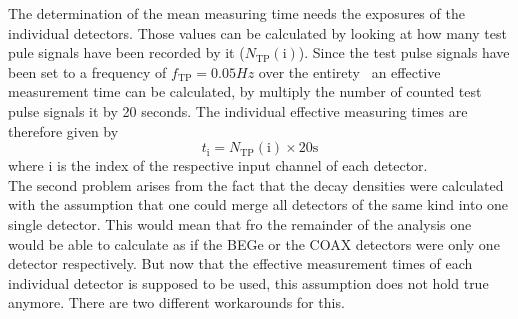\documentclass[encoding=utf8,british]{tumphthesis}
\begin{document}

\iffalse
The determination of the mean measuring time needs the exposures of the individual detectors.
Those values can be calculated by looking at how many test pule signals have been recorded by it ($N_{\mathrm{TP}}(\mathrm{i})$). 
Since the test pulse signals have been set to a frequency of $f_\mathrm{TP} = 0.05\unit{Hz} $ over the entirety \PII\, an effective measurement time can be calculated, by multiply the number of counted test pulse signals it by 20 seconds.
The individual effective measuring times are therefore given by
\begin{equation*}
    t_\mathrm{i} = N_{\mathrm{TP}}(\mathrm{i}) \times 20\mathrm{s}
\end{equation*}
where i is the index of the respective input channel of each detector.
\\

The second problem arises from the fact that the decay densities were  calculated with the assumption that one could merge all detectors of the same kind into one single detector.
This would mean that fro the remainder of the analysis one would be able to calculate as if the BEGe or the COAX detectors were only one detector respectively.
But now that the effective measurement times of each individual detector is supposed to be used, this assumption does not hold true anymore.
There are two different workarounds for this.
\\
\end{document}
